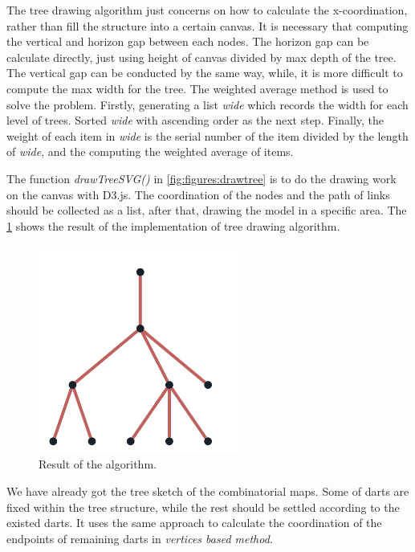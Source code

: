   \newpage
  The tree drawing algorithm just concerns on how to calculate the x-coordination, rather than fill the structure into a certain canvas. It is necessary that computing the vertical and horizon gap between each nodes. The horizon gap can be calculate directly, just using height of canvas divided by max depth of the tree. The vertical gap can be conducted by the same way, while, it is more difficult to compute the max width for the tree. The weighted average method is used to solve the problem. Firstly, generating a list \textit{wide} which records the width for each level of trees. Sorted \textit{wide} with ascending order as the next step. Finally, the weight of each item in \textit{wide} is the serial number of the item divided by the length of \textit{wide}, and the computing the weighted average of items. 

  The function \textit{drawTreeSVG()} in \cref{fig:figures:drawtree} is to do the drawing work on the canvas with D3.js. The coordination of the nodes and the path of links should be collected as a list, after that, drawing the model in a specific area. The \cref{fig:figures:treedraw} shows the result of the implementation of tree drawing algorithm.

  \begin{figure}[htb]
    \centering
    \includegraphics[width=0.6\textwidth]{../../image/treedraw.png}
    \caption{Result of the algorithm.}
    \label{fig:figures:treedraw}
  \end{figure}
  \newpage
  We have already got the tree sketch of the combinatorial maps. Some of darts are fixed within the tree structure, while the rest should be settled according to the existed darts. It uses the same approach to calculate the coordination of the endpoints of remaining darts in \textit{vertices based method}. 

